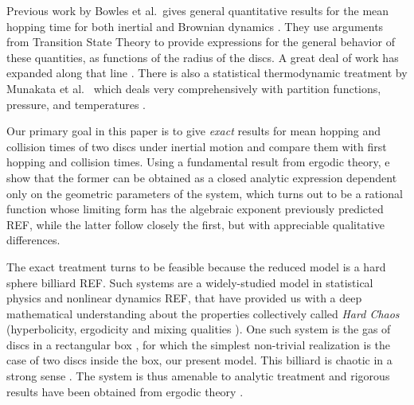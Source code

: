 \documentclass[superscriptaddress,pre,reprint,showpacs,onecolumn]{revtex4-1}
\newcommand{\etal}{et al.\ }
\begin{document}
Previous work
by Bowles \etal gives general quantitative results for the mean hopping 
time for both inertial and Brownian dynamics \cite{Bowles04}. 
They use arguments from Transition State Theory 
to provide expressions for the general behavior of these quantities, as functions of the
radius of the discs. %
A great deal of work has expanded along that line  \cite{Suh05, Ball09}.
There is also a statistical thermodynamic treatment by Munakata \etal 
which deals very comprehensively with partition functions, pressure,
and temperatures \cite{Munakata02, Munakata06}. 

Our  primary goal in this paper is
to give  \emph{exact} results for mean hopping and collision times of two discs under 
inertial motion and compare them with first hopping and collision times.
Using a fundamental result from ergodic theory, e show that the former can 
be obtained  as a closed analytic expression dependent only
on the geometric parameters of the system, which turns 
out to be a rational function whose limiting form
has the algebraic exponent previously predicted REF, while
the latter follow closely the first, but with appreciable
qualitative differences. 

The exact treatment  turns to be  feasible because  
the reduced model is a hard sphere billiard REF.
Such systems are a widely-studied model in
statistical physics and nonlinear dynamics REF,
that have provided us with a deep mathematical understanding
about  the properties collectively called  \emph{Hard Chaos} 
(hyperbolicity, ergodicity and mixing qualities \cite{Sinai70, Gallavotti74}). 
One such system is the
gas of discs in a rectangular box \cite{SzaszBook00}, 
for which the simplest non-trivial
realization is the case of  two discs inside the box, our
present model.
This billiard is chaotic in a
strong sense \cite{Sim99}. The system  is thus amenable
to analytic treatment
and rigorous results have been obtained from ergodic theory \cite{MarkChern}.

\end{document}
